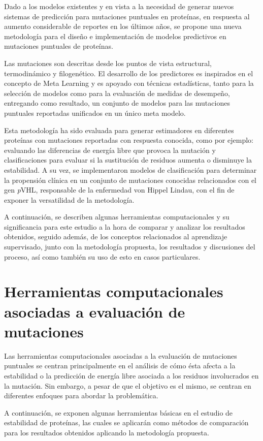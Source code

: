 Dado a los modelos existentes y en vista a la necesidad de generar nuevos sistemas de predicción para mutaciones puntuales en proteínas, en respuesta al aumento considerable de reportes en los últimos años, se propone una nueva metodología para el diseño e implementación de modelos predictivos en mutaciones puntuales de proteínas.

Las mutaciones son descritas desde los puntos de vista estructural, termodinámico y filogenético. El desarrollo de los predictores es inspirados en el concepto de Meta Learning y es apoyado con técnicas estadísticas, tanto para la selección de modelos como para la evaluación de medidas de desempeño, entregando como resultado, un conjunto de modelos para las mutaciones puntuales reportadas unificados en un único meta modelo.

Esta metodología ha sido evaluada para generar estimadores en diferentes proteínas con mutaciones reportadas con respuesta conocida, como por ejemplo: evaluando las diferencias de energía libre que provoca la mutación y clasificaciones para evaluar si la sustitución de residuos aumenta o disminuye la estabilidad. A su vez, se implementaron modelos de clasificación para determinar la propensión clínica en un conjunto de mutaciones conocidas relacionados con el gen \textit{p}VHL, responsable de la enfermedad von Hippel Lindau, con el fin de exponer la versatilidad de la metodología.

A continuación, se describen algunas herramientas computacionales y su significancia para este estudio a la hora de comparar y analizar los resultados obtenidos, seguido además, de los conceptos relacionados al aprendizaje supervisado, junto con la metodología propuesta, los resultados y discusiones del proceso, así como también su uso de esto en casos particulares.

\section{Herramientas computacionales asociadas a evaluación de mutaciones}

Las herramientas computacionales asociadas a la evaluación de mutaciones puntuales se centran principalmente en el análisis de cómo ésta afecta a la estabilidad o la predicción de energía libre asociada a los residuos involucrados en la mutación. Sin embargo, a pesar de que el objetivo es el mismo, se centran en diferentes enfoques para abordar la problemática.

A continuación, se exponen algunas herramientas básicas en el estudio de estabilidad de proteínas, las cuales se aplicarán como métodos de comparación para los resultados obtenidos aplicando la metodología propuesta.

